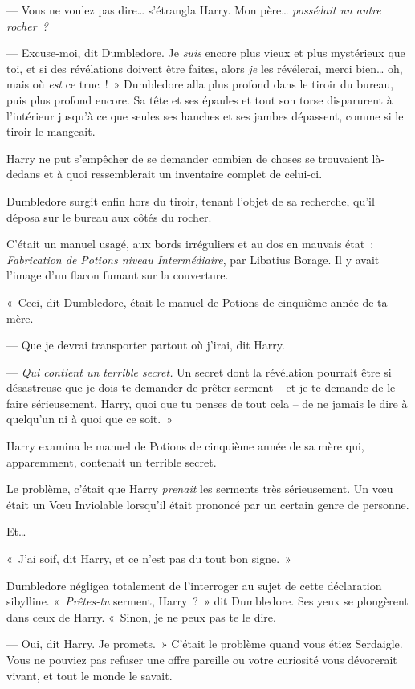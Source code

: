 --- Vous ne voulez pas dire… s'étrangla Harry. Mon père… \emph{possédait un autre rocher~?}

--- Excuse-moi, dit Dumbledore. Je \emph{suis} encore plus vieux et plus mystérieux que toi, et si des révélations doivent être faites, alors \emph{je} les révélerai, merci bien… oh, mais où \emph{est} ce truc~!~» Dumbledore alla plus profond dans le tiroir du bureau, puis plus profond encore. Sa tête et ses épaules et tout son torse disparurent à l'intérieur jusqu'à ce que seules ses hanches et ses jambes dépassent, comme si le tiroir le mangeait.

Harry ne put s'empêcher de se demander combien de choses se trouvaient là-dedans et à quoi ressemblerait un inventaire complet de celui-ci.

Dumbledore surgit enfin hors du tiroir, tenant l'objet de sa recherche, qu'il déposa sur le bureau aux côtés du rocher.

C'était un manuel usagé, aux bords irréguliers et au dos en mauvais état~: \emph{Fabrication de Potions niveau Intermédiaire}, par Libatius Borage. Il y avait l'image d'un flacon fumant sur la couverture.

«~Ceci, dit Dumbledore, était le manuel de Potions de cinquième année de ta mère.

--- Que je devrai transporter partout où j'irai, dit Harry.

--- \emph{Qui contient un terrible secret.} Un secret dont la révélation pourrait être si désastreuse que je dois te demander de prêter serment -- et je te demande de le faire sérieusement, Harry, quoi que tu penses de tout cela -- de ne jamais le dire à quelqu'un ni à quoi que ce soit.~»

Harry examina le manuel de Potions de cinquième année de sa mère qui, apparemment, contenait un terrible secret.

Le problème, c'était que Harry \emph{prenait} les serments très sérieusement. Un vœu était un Vœu Inviolable lorsqu'il était prononcé par un certain genre de personne.

Et…

«~J'ai soif, dit Harry, et ce n'est pas du tout bon signe.~»

Dumbledore négligea totalement de l'interroger au sujet de cette déclaration sibylline. «~\emph{Prêtes-tu} serment, Harry~?~» dit Dumbledore. Ses yeux se plongèrent dans ceux de Harry. «~Sinon, je ne peux pas te le dire.

--- Oui, dit Harry. Je promets.~» C'était le problème quand vous étiez Serdaigle. Vous ne pouviez pas refuser une offre pareille ou votre curiosité vous dévorerait vivant, et tout le monde le savait.

